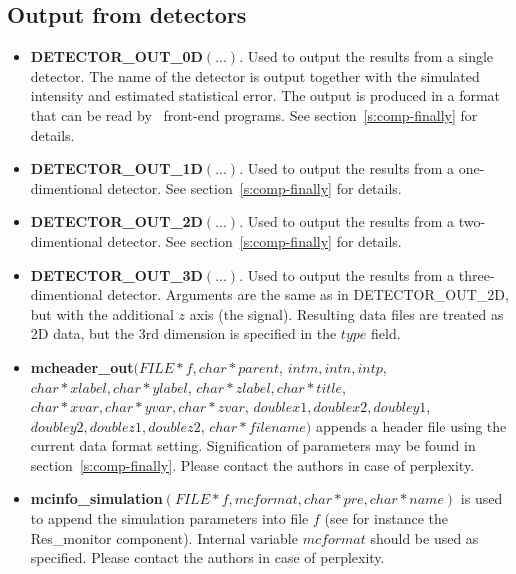 \subsection{Output from detectors}
\begin{itemize}
\item {\bf DETECTOR\_OUT\_0D}$(...)$. Used to output the results from a
  single detector. The name of the detector is output together
  with the simulated intensity and estimated statistical error. The
  output is produced in a format that can be read by \MCS\ front-end
  programs. See section~\ref{s:comp-finally} for details.
\item {\bf DETECTOR\_OUT\_1D}$(...)$. Used to output the results from a
  one-dimentional detector. See section~\ref{s:comp-finally} for details.
\item {\bf DETECTOR\_OUT\_2D}$(...)$. Used to output the results from a
  two-dimentional detector. See section~\ref{s:comp-finally} for details.
\item {\bf DETECTOR\_OUT\_3D}$(...)$. Used to output
  the results from a three-dimentional detector. Arguments are the same as
  in DETECTOR\_OUT\_2D, but with the additional $z$ axis (the signal).
  Resulting data files are treated as 2D data, but the 3rd dimension is
  specified in the $type$ field.
\item {\bf mcheader\_out}$(FILE *f,char *parent$,
  $int m, int n, int p$,
  $char *xlabel, char *ylabel$, $char *zlabel, char *title$,
  $char *xvar, char *yvar, char *zvar$,
  $double x1, double x2, double y1$, $ double y2, double z1, double z2$,
  $char *filename)$ appends a header file using the current data format setting. Signification of parameters may be found in section~\ref{s:comp-finally}. Please contact the authors in case of perplexity.
\item {\bf mcinfo\_simulation}$(FILE *f, mcformat, 
  char *pre, char *name)$ is used to append the simulation parameters into file $f$ (see for instance the Res\_monitor component). Internal variable $mcformat$ should be used as specified. Please contact the authors in case of perplexity.
\end{itemize}

